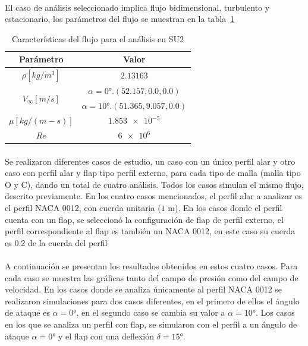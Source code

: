 \documentclass[letterpaper, openright, 12pt]{book}
\begin{document}
    \paragraph*{}
    El caso de análisis seleccionado implica flujo bidimensional, turbulento y
    estacionario, los parámetros del flujo se muestran en la
    tabla~\ref{SU2_simulation}
    \begin{table}[htbp!]
    \begin{center}
        \begin{tabular}{| c | c |}
        \hline
        Parámetro & Valor\\
        \hline
        $\rho[kg / m^3]$ &  $2.13163$\\
        \hline
        \multirow{2}{*}{$V_{\infty}[m / s]$} & $\alpha = \ang{0}.
        (52.157, 0.0, 0.0)$\\
        & $\alpha = \ang{10}. (51.365, 9.057, 0.0)$\\
        \hline
        $\mu[kg / (m-s)]$ &  $\num{1.853e-5}$\\
        \hline
        $Re$ & $\num{6e6}$\\
        \hline
        \end{tabular}
        \caption{Características del flujo para el análisis en SU2}
        \label{SU2_simulation}
    \end{center}
    \end{table}

    \paragraph*{}
    Se realizaron diferentes casos de estudio, un caso con un único perfil alar
    y otro caso con perfil alar y flap tipo perfil externo, para cada tipo de
    malla (malla tipo O y C), dando un total de cuatro análisis. Todos los
    casos simulan el mismo flujo, descrito previamente. En los cuatro casos
    mencionados, el perfil alar a analizar es el perfil NACA 0012, con cuerda
    unitaria ($1$ m). En los casos donde el perfil cuenta con un flap, se
    seleccionó la configuración de flap de perfil externo, el perfil
    correspondiente al flap es también un NACA 0012, en este caso su cuerda es
    $0.2$ de la cuerda del perfil

    \paragraph*{}
    A continuación se presentan los resultados obtenidos en estos cuatro casos.
    Para cada caso se muestra las gráficas tanto del campo de presión como del
    campo de velocidad. En los casos donde se analiza únicamente al perfil NACA
    0012 se realizaron simulaciones para dos casos diferentes, en el primero de
    ellos el ángulo de ataque es $\alpha = 0\si{\degree}$, en el segundo caso
    se cambia su valor a $\alpha = 10\si{\degree}$. Los casos en los que se
    analiza un perfil con flap, se simularon con el perfil a un ángulo de
    ataque $\alpha = 0 \si{\degree}$ y el flap con una deflexión $\delta = 15
    \si{\degree}$.
\end{document}
